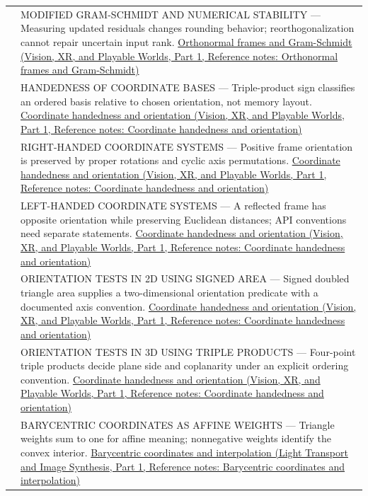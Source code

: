 {\begin{longtable}[]{@{}
  >{\raggedright\arraybackslash}p{}
  >{\raggedright\arraybackslash}p{}@{}}
562 & MODIFIED GRAM-SCHMIDT AND NUMERICAL STABILITY --- Measuring updated residuals changes rounding behavior; reorthogonalization cannot repair uncertain input rank. \href{../07-Vision-XR-and-Playable-Worlds-P01/main.pdf\#appendix-c39f1ed34271}{Orthonormal frames and Gram-Schmidt (Vision, XR, and Playable Worlds, Part 1, Reference notes: Orthonormal frames and Gram-Schmidt)} \\
563 & HANDEDNESS OF COORDINATE BASES --- Triple-product sign classifies an ordered basis relative to chosen orientation, not memory layout. \href{../07-Vision-XR-and-Playable-Worlds-P01/main.pdf\#appendix-87d7626c8d37}{Coordinate handedness and orientation (Vision, XR, and Playable Worlds, Part 1, Reference notes: Coordinate handedness and orientation)} \\
564 & RIGHT-HANDED COORDINATE SYSTEMS --- Positive frame orientation is preserved by proper rotations and cyclic axis permutations. \href{../07-Vision-XR-and-Playable-Worlds-P01/main.pdf\#appendix-87d7626c8d37}{Coordinate handedness and orientation (Vision, XR, and Playable Worlds, Part 1, Reference notes: Coordinate handedness and orientation)} \\
565 & LEFT-HANDED COORDINATE SYSTEMS --- A reflected frame has opposite orientation while preserving Euclidean distances; API conventions need separate statements. \href{../07-Vision-XR-and-Playable-Worlds-P01/main.pdf\#appendix-87d7626c8d37}{Coordinate handedness and orientation (Vision, XR, and Playable Worlds, Part 1, Reference notes: Coordinate handedness and orientation)} \\
566 & ORIENTATION TESTS IN 2D USING SIGNED AREA --- Signed doubled triangle area supplies a two-dimensional orientation predicate with a documented axis convention. \href{../07-Vision-XR-and-Playable-Worlds-P01/main.pdf\#appendix-87d7626c8d37}{Coordinate handedness and orientation (Vision, XR, and Playable Worlds, Part 1, Reference notes: Coordinate handedness and orientation)} \\
567 & ORIENTATION TESTS IN 3D USING TRIPLE PRODUCTS --- Four-point triple products decide plane side and coplanarity under an explicit ordering convention. \href{../07-Vision-XR-and-Playable-Worlds-P01/main.pdf\#appendix-87d7626c8d37}{Coordinate handedness and orientation (Vision, XR, and Playable Worlds, Part 1, Reference notes: Coordinate handedness and orientation)} \\
568 & BARYCENTRIC COORDINATES AS AFFINE WEIGHTS --- Triangle weights sum to one for affine meaning; nonnegative weights identify the convex interior. \href{../04-Light-Transport-and-Image-Synthesis-P01/main.pdf\#appendix-02b9d9a81dca}{Barycentric coordinates and interpolation (Light Transport and Image Synthesis, Part 1, Reference notes: Barycentric coordinates and interpolation)} \\

\end{longtable}}
